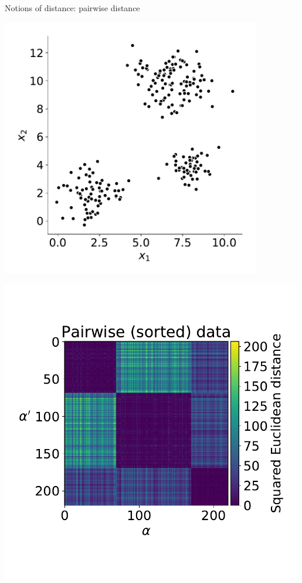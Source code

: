 \begin{frame}{Notions of distance: pairwise distance}

\begin{center}
\begin{minipage}{0.32\textwidth}
	\includegraphics[width=0.85\textwidth]{img/m3_data_nocolor} 
\end{minipage}
\begin{minipage}{0.32\textwidth}
	\includegraphics[width=0.99\textwidth]{img/m3_pdist} 

\end{minipage}
\end{center}
\end{frame}
